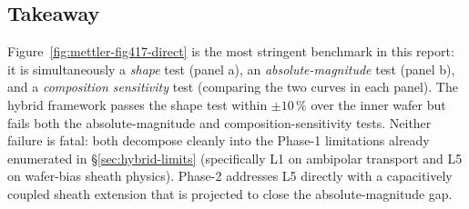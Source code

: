 \subsection{Takeaway}

Figure~\ref{fig:mettler-fig417-direct} is the most stringent benchmark in this report: it is simultaneously a \emph{shape} test (panel a), an \emph{absolute-magnitude} test (panel b), and a \emph{composition sensitivity} test (comparing the two curves in each panel).  The hybrid framework passes the shape test within $\pm 10\,\%$ over the inner wafer but fails both the absolute-magnitude and composition-sensitivity tests.  Neither failure is fatal: both decompose cleanly into the Phase-1 limitations already enumerated in \S\ref{sec:hybrid-limits} (specifically L1 on ambipolar transport and L5 on wafer-bias sheath physics).  Phase-2 addresses L5 directly with a capacitively coupled sheath extension that is projected to close the absolute-magnitude gap.
